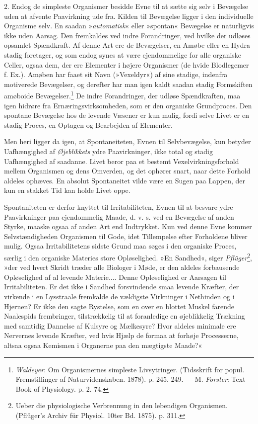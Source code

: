 \documentclass[12pt,a4paper,openany]{book}
\newcommand{\opage}[1]{\marginnote{\footnotesize\textit{[#1]}}}
\begin{document}
2. Endog de simpleste Organismer besidde Evne til at sætte sig selv i
Bevægelse uden at afvente Paavirkning ude fra. Kilden til Bevægelse
ligger i den individuelle Organisme selv. En saadan »\emph{automatisk}«
eller »spontan« Bevægelse er naturligvis ikke uden Aarsag. Den
fremkaldes ved indre
\opage{366}Forandringer, ved hvilke der udløses opsamlet Spændkraft. Af
denne Art ere de Bevægelser, en Amøbe eller en Hydra stadig foretager,
og som endog synes at være ejendommelige for alle organiske Celler,
ogsaa dem, der ere Elementer i højere Organismer (de hvide Blodlegemer
f. Ex.). Amøben har faaet sit Navn (»Vexeldyr«) af sine stadige,
indenfra motiverede Bevægelser, og derefter har man igen kaldt saadan
stadig Formskiften amøboide Bevægelser.\footnote[1]{\emph{Waldeyer}: Om
Organismernes simpleste Livsytringer. (Tidsskrift for popul.
Fremstillinger af Naturvidenskaben. 1878). p. 245. 249. --- M.
\emph{Forster}: Text Book of Physiology. p. 2. 74.} De indre
Forandringer, der udløse Spændkraften, maa igen hidrøre fra
Ernæringsvirksomheden, som er den organiske Grundproces. Den spontane
Bevægelse hos de levende Væsener er kun mulig, fordi selve Livet er en
stadig Proces, en Optagen og Bearbejden af Elementer.

Men heri ligger da igen, at Spontaneiteten, Evnen til Selvbevægelse, kun
betyder Uafhængighed af \emph{Øjeblikkets} ydre Paavirkninger, ikke
total og stadig Uafhængighed af saadanne. Livet beror paa et bestemt
Vexelvirkningsforhold mellem Organismen og dens Omverden, og det ophører
snart, naar dette Forhold aldeles ophæves. En absolut Spontaneitet vilde
være en Sugen paa Lappen, der kun en stakket Tid kan holde Livet oppe.

Spontaniteten er derfor knyttet til Irritabiliteten, Evnen til at
besvare ydre Paavirkninger paa ejendommelig Maade, d. v. s. ved en
Bevægelse af anden Styrke, maaske ogsaa af anden Art end Indtrykket. Kun
ved denne Evne kommer Selvstændigheden Organismen til Gode, idet
Tillempelse efter Forholdene bliver mulig. Ogsaa Irritabilitetens sidste
Grund maa søges i den organiske Proces, særlig i den organiske Materies
store Opløselighed. »En Sandhed«, siger \emph{Pflüger}\footnote[2]{Ueber
die physiologische Verbrennung in den lebendigen Organismen. (Pflüger’s
Archiv für Physiol. 10ter Bd. 1875). p. 311.}, »der ved hvert Skridt
træder alle Biologer i Møde, er den aldeles forbausende Opløselighed af
al levende Materie.... Denne Opløselighed er Aarsagen til
Irritabiliteten. Er det ikke i Sandhed forsvindende smaa levende
Kræfter, der virkende
\opage{367}i en Lysstraale fremkalde de vældigste Virkninger i Nethinden
og i Hjernen? Er ikke den sagte Rystelse, som en over en blottet Muskel
farende Naalespids frembringer, tilstrækkelig til at foranledige en
øjeblikkelig Trækning med samtidig Dannelse af Kulsyre og Mælkesyre?
Hvor aldeles minimale ere Nervernes levende Kræfter, ved hvis Hjælp de
formaa at forhøje Processerne, altsaa ogsaa Kemismen i Organerne paa den
mægtigste Maade?«
\end{document}
